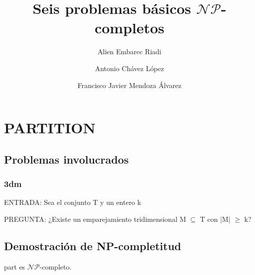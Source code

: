 \documentclass[11pt, a4paper]{memoir}
\title{\Huge Seis problemas básicos $\mathcal{NP}$-completos}
\author{Alien Embarec Riadi}
\author{Antonio Chávez López}
\author{Francisco Javier Mendoza Álvarez}
\affil{Grado en Ingeniería Informática. Universidad de La Laguna}
\begin{document}
\maketitle

\chapter{PARTITION}

\section{Problemas involucrados}

\subsection*{\gls{3dm}}

\noindent ENTRADA: Sea el conjunto T y un entero k 

\noindent PREGUNTA: ¿Existe un emparejamiento tridimensional M $\subseteq$ T con $\mid$M$\mid$ $\geq$ k? 


\section{Demostración de NP-completitud}

\begin{thm}
	\gls{part} es $\mathcal{NP}$-completo.
\end{thm}
\end{document}
